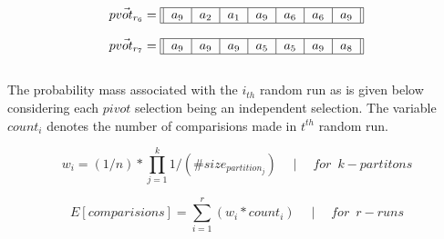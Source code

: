 \documentclass[usenames,dvipsnames,acmsmall]{acmart}
\begin{document}
\begin{equation}
	\vec{pvot_{r_{6}}} = \begin{tabular}{||c|c|c|c|c|c|c||}
		\hline
		$a_9$ & $a_2$ & $a_1$ & $a_9$ & $a_6$ & $a_6$ & $a_9$ \\
		\hline
	\end{tabular}
\end{equation} 

\begin{equation}
	\vec{pvot_{r_{7}}} = \begin{tabular}{||c|c|c|c|c|c|c||}
		\hline
		$a_9$ & $a_9$ & $a_9$ & $a_5$ & $a_5$ & $a_9$ & $a_8$ \\
		\hline
	\end{tabular}
\end{equation} \\

The probability mass associated with the $i_{th}$ random run as is given below considering each $pivot$ selection being an independent selection. The variable $count_i$ denotes the number of comparisions made in $t^{th}$ random run.

\begin{equation}
	w_i = (1 / n) * \prod_{j=1}^{k} 1 / (\#size_{partition_{j}}) \quad \mid \quad for \enspace k-partitons
\end{equation}

\begin{equation}
	E[comparisions] = \sum_{i=1}^{r} (w_i * count_i) \quad \mid \quad for \enspace r-runs
\end{equation}
\end{document}
